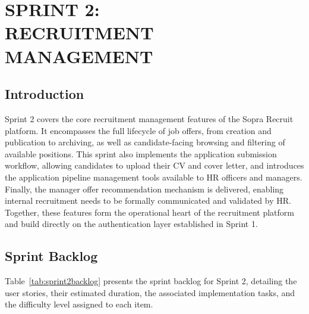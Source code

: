 ﻿\chapter[SPRINT 2: RECRUITMENT MANAGEMENT]{SPRINT 2:\\ RECRUITMENT MANAGEMENT}
\thispagestyle{MyStyle}
\minitoc
\newpage
\thispagestyle{MyStyle}

\section*{Introduction}

Sprint 2 covers the core recruitment management features of the Sopra Recruit platform. It encompasses the full lifecycle of job offers, from creation and publication to archiving, as well as candidate-facing browsing and filtering of available positions. This sprint also implements the application submission workflow, allowing candidates to upload their CV and cover letter, and introduces the application pipeline management tools available to HR officers and managers. Finally, the manager offer recommendation mechanism is delivered, enabling internal recruitment needs to be formally communicated and validated by HR. Together, these features form the operational heart of the recruitment platform and build directly on the authentication layer established in Sprint 1.

\section{Sprint Backlog}

Table~\ref{tab:sprint2backlog} presents the sprint backlog for Sprint 2, detailing the user stories, their estimated duration, the associated implementation tasks, and the difficulty level assigned to each item.

